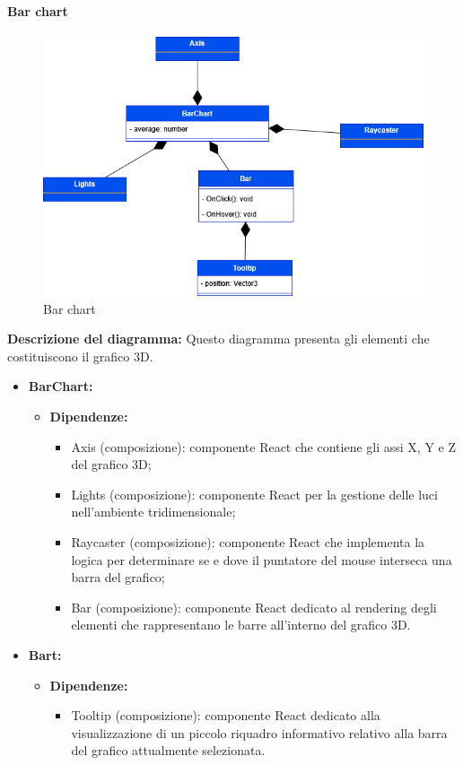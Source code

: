 \paragraph{Bar chart}
\begin{figure}[h!] \centering
    \includegraphics[scale=0.45]{template/images/uml_front/ui/barchart.png}
    \caption{Bar chart}
\end{figure}
\textbf{Descrizione del diagramma:}
Questo diagramma presenta gli elementi che costituiscono il grafico 3D.
\begin{itemize}
    \item \textbf{BarChart:}
    \begin{itemize}
        \item \textbf{Dipendenze:}
        \begin{itemize}
            \item Axis (composizione): componente React che contiene gli assi X, Y e Z del grafico 3D;
            \item Lights (composizione): componente React per la gestione delle luci nell'ambiente tridimensionale;
            \item Raycaster (composizione): componente React che implementa la logica per determinare se e dove il puntatore del mouse interseca una barra del grafico;
            \item Bar (composizione): componente React dedicato al rendering degli elementi che rappresentano le barre all'interno del grafico 3D.
        \end{itemize} 
    \end{itemize}

    \item \textbf{Bart:}
    \begin{itemize}
        \item \textbf{Dipendenze:}
        \begin{itemize}
            \item Tooltip (composizione): componente React dedicato alla visualizzazione di un piccolo riquadro informativo relativo alla barra del grafico attualmente selezionata.
        \end{itemize} 
    \end{itemize}
\end{itemize}

